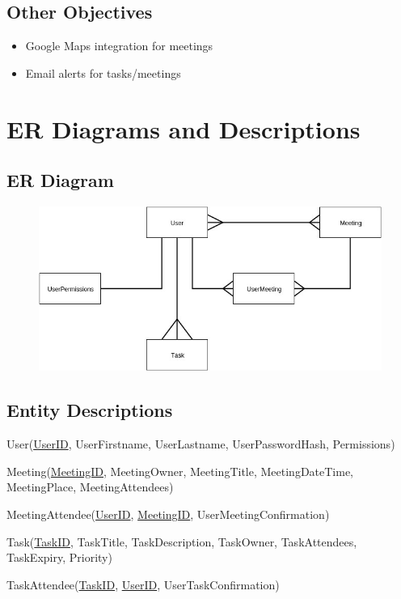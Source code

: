 \subsection{Other Objectives}
	\begin{itemize}
		\item Google Maps integration for meetings
		\item Email alerts for tasks/meetings
	\end{itemize}

\section{ER Diagrams and Descriptions}

\subsection{ER Diagram}

\begin{figure}[H]
	\includegraphics[width=\textwidth]{./Analysis/diagrams/era.jpg}
\end{figure}

\subsection{Entity Descriptions}

User(\underline{UserID}, UserFirstname, UserLastname, UserPasswordHash, Permissions)

Meeting(\underline{MeetingID}, MeetingOwner, MeetingTitle, MeetingDateTime, MeetingPlace, MeetingAttendees)

MeetingAttendee(\underline{UserID}, \underline{MeetingID}, UserMeetingConfirmation)

Task(\underline{TaskID}, TaskTitle, TaskDescription, TaskOwner, TaskAttendees, TaskExpiry, Priority)

TaskAttendee(\underline{TaskID}, \underline{UserID}, UserTaskConfirmation)

